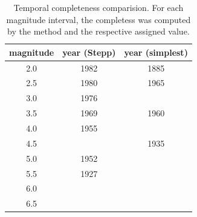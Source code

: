 \documentclass[grl]{agutex}
\begin{document}
\begin{table}[H]
	\caption{Temporal completeness comparision. For each magnitude interval,
	the completess was computed by the \citet{stepp_1972} method and the respective assigned value.}
	\begin{tabular}{c c c}
		\hline
	\textbf{magnitude} & \textbf{year (Stepp)} & \textbf{year (simplest)} \\
		\hline
		2.0 & 1982 	& 1885 \\
		2.5 & 1980 	& 1965 \\
		3.0 & 1976 	&  \\
		3.5 & 1969 	& 1960 \\
		4.0 & 1955 	&  \\
		4.5 &  		& 1935 \\
		5.0 & 1952 	&  \\
		5.5 & 1927 	&  \\
		6.0 &  		&  \\
		6.5 &  		&  \\
		\hline
	\end{tabular}
	\label{tab:completeness}
\end{table}
\end{document}
